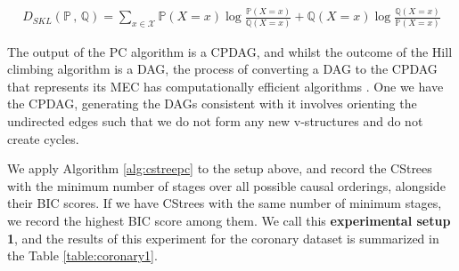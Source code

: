 \documentclass{tufte-book}
\begin{document}
\begin{align*}
D_{SKL}(\mathbb{P} \, , \, \mathbb{Q}) = \sum_{x \in \mathcal{X}} \mathbb{P}(X=x)\log \frac{\mathbb{P}(X = x)}{\mathbb{Q}(X=x)} + \mathbb{Q}(X=x)\log \frac{\mathbb{Q}(X = x)}{\mathbb{P}(X=x)}
\end{align*}


The output of the PC algorithm is a CPDAG, and whilst the outcome of the Hill climbing algorithm is a DAG, the process of converting a DAG to the CPDAG that represents its MEC has computationally efficient algorithms \cite{chickering-2002-learn-equiv}. One we have the CPDAG, generating the DAGs consistent with it involves orienting the undirected edges such that we do not form any new v-structures and do not create cycles. 


We apply Algorithm \ref{alg:cstreepc} to the setup above, and record the CStrees with the minimum number of stages over all possible causal orderings, alongside their BIC scores. If we have CStrees with the same number of minimum stages, we record the highest BIC score among them. We call this \textbf{experimental setup 1}, and the results of this experiment for the coronary dataset is summarized in the Table \ref{table:coronary1}.
\end{document}

